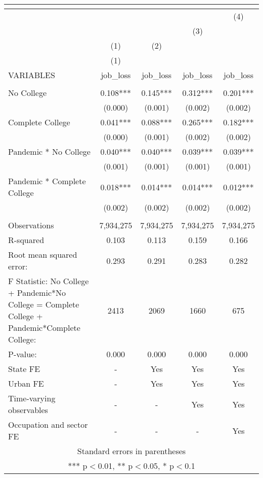 \begin{tabular}{lcccc}
\multicolumn{5}{c}{} \\ \hline
 &  &  &  & (4) \\
 &  &  & (3) &  \\
 & (1) & (2) &  &  \\
 & (1) &  &  &  \\
VARIABLES & job\_loss & job\_loss & job\_loss & job\_loss \\ \hline
 &  &  &  &  \\
No College & 0.108*** & 0.145*** & 0.312*** & 0.201*** \\
 & (0.000) & (0.001) & (0.002) & (0.002) \\
Complete College & 0.041*** & 0.088*** & 0.265*** & 0.182*** \\
 & (0.000) & (0.001) & (0.002) & (0.002) \\
Pandemic * No College & 0.040*** & 0.040*** & 0.039*** & 0.039*** \\
 & (0.001) & (0.001) & (0.001) & (0.001) \\
Pandemic * Complete College & 0.018*** & 0.014*** & 0.014*** & 0.012*** \\
 & (0.002) & (0.002) & (0.002) & (0.002) \\
 &  &  &  &  \\
Observations & 7,934,275 & 7,934,275 & 7,934,275 & 7,934,275 \\
R-squared & 0.103 & 0.113 & 0.159 & 0.166 \\
Root mean squared error: & 0.293 & 0.291 & 0.283 & 0.282 \\
F Statistic: No College + Pandemic*No College = Complete College + Pandemic*Complete College: & 2413 & 2069 & 1660 & 675 \\
\hspace{1mm} P-value: & 0.000 & 0.000 & 0.000 & 0.000 \\
State FE & - & Yes & Yes & Yes \\
Urban FE & - & Yes & Yes & Yes \\
Time-varying observables & - & - & Yes & Yes \\
 Occupation and sector FE & - & - & - & Yes \\ \hline
\multicolumn{5}{c}{ Standard errors in parentheses} \\
\multicolumn{5}{c}{ *** p$<$0.01, ** p$<$0.05, * p$<$0.1} \\
\end{tabular}
